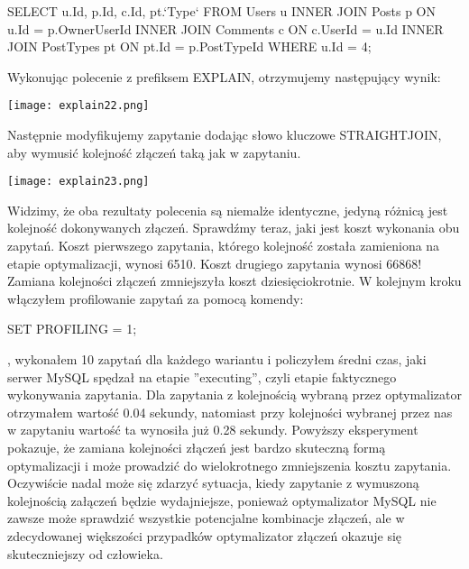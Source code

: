 \begin{spverbatim}
	SELECT u.Id, p.Id, c.Id, pt.`Type` FROM Users u INNER JOIN Posts p ON u.Id = p.OwnerUserId	INNER JOIN Comments c ON c.UserId = u.Id INNER JOIN PostTypes pt ON pt.Id = p.PostTypeId WHERE u.Id = 4;
\end{spverbatim}

Wykonując polecenie z prefiksem EXPLAIN, otrzymujemy następujący wynik:
\begin{center}
	\texttt{[image: explain22.png]} 
\end{center}
Następnie modyfikujemy zapytanie dodając słowo kluczowe STRAIGHT\textunderscore JOIN, aby wymusić kolejność złączeń taką jak w zapytaniu.
\begin{center}
	\texttt{[image: explain23.png]} 
\end{center}
Widzimy, że oba rezultaty polecenia są niemalże identyczne, jedyną różnicą jest kolejność dokonywanych złączeń. Sprawdźmy teraz, jaki jest koszt wykonania obu zapytań. Koszt pierwszego zapytania, którego kolejność została zamieniona na etapie optymalizacji, wynosi 6510. Koszt drugiego zapytania wynosi 66868! Zamiana kolejności złączeń zmniejszyła koszt dziesięciokrotnie.
W kolejnym kroku włączyłem profilowanie zapytań za pomocą komendy:
\begin{spverbatim}
	SET PROFILING = 1;
\end{spverbatim}, wykonałem 10 zapytań dla każdego wariantu i policzyłem średni czas, jaki serwer MySQL spędzał na etapie ''executing'', czyli etapie faktycznego wykonywania zapytania. Dla zapytania z kolejnością wybraną przez optymalizator otrzymałem wartość 0.04 sekundy, natomiast przy kolejności wybranej przez nas w zapytaniu wartość ta wynosiła już 0.28 sekundy. Powyższy eksperyment pokazuje, że zamiana kolejności złączeń jest bardzo skuteczną formą optymalizacji i może prowadzić do wielokrotnego zmniejszenia kosztu zapytania. Oczywiście nadal może się zdarzyć sytuacja, kiedy zapytanie z wymuszoną kolejnością załączeń będzie wydajniejsze, ponieważ optymalizator MySQL nie zawsze może sprawdzić wszystkie potencjalne kombinacje złączeń, ale w zdecydowanej większości przypadków optymalizator złączeń okazuje się skuteczniejszy od człowieka.

